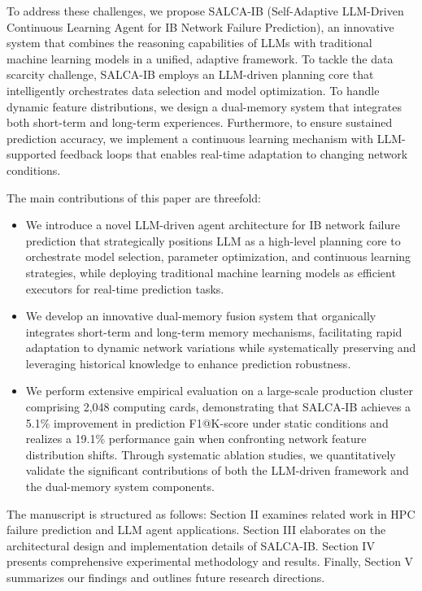 \documentclass[conference]{IEEEtran}
\begin{document}
To address these challenges, we propose SALCA-IB (Self-Adaptive LLM-Driven Continuous Learning Agent for IB Network Failure Prediction), an innovative system that combines the reasoning capabilities of LLMs with traditional machine learning models in a unified, adaptive framework. To tackle the data scarcity challenge, SALCA-IB employs an LLM-driven planning core that intelligently orchestrates data selection and model optimization. To handle dynamic feature distributions, we design a dual-memory system that integrates both short-term and long-term experiences. Furthermore, to ensure sustained prediction accuracy, we implement a continuous learning mechanism with LLM-supported feedback loops that enables real-time adaptation to changing network conditions.

The main contributions of this paper are threefold:
\begin{itemize}
    \item We introduce a novel LLM-driven agent architecture for IB network failure prediction that strategically positions LLM as a high-level planning core to orchestrate model selection, parameter optimization, and continuous learning strategies, while deploying traditional machine learning models as efficient executors for real-time prediction tasks.
    \item We develop an innovative dual-memory fusion system that organically integrates short-term and long-term memory mechanisms, facilitating rapid adaptation to dynamic network variations while systematically preserving and leveraging historical knowledge to enhance prediction robustness.
    \item We perform extensive empirical evaluation on a large-scale production cluster comprising 2,048 computing cards, demonstrating that SALCA-IB achieves a 5.1\% improvement in prediction F1@K-score under static conditions and realizes a 19.1\% performance gain when confronting network feature distribution shifts. Through systematic ablation studies, we quantitatively validate the significant contributions of both the LLM-driven framework and the dual-memory system components.
\end{itemize}

The manuscript is structured as follows: Section II examines related work in HPC failure prediction and LLM agent applications. Section III elaborates on the architectural design and implementation details of SALCA-IB. Section IV presents comprehensive experimental methodology and results. Finally, Section V summarizes our findings and outlines future research directions.
\end{document}

